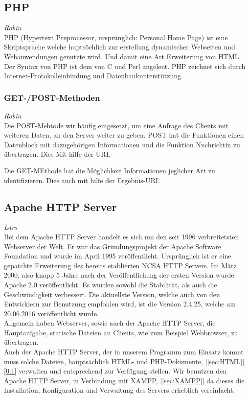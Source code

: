 \documentclass[12pt,a4paper,bibliography=totocnumbered,listof=totocnumbered]{scrartcl}
\begin{document}
\pagebreak
\subsection{PHP}
\label{sec:PHP}
\emph{Robin}\\
PHP (Hypertext Preprocessor, ursprünglich: Personal Home Page) ist eine Skriptsprache welche huptsöchlich zur erstellung dynamischer Webseiten und Webanwendungen genutzte wird. Und damit eine Art Erweiterung von HTML. Der Syntax von PHP ist dem von C und Perl angelent. PHP zeichnet sich durch Internet-Protokolleinbindung und Datenbankunterstützung.
 \cite{PHP}


\subsubsection{GET-/POST-Methoden}
\emph{Robin}\\
Die POST-Mehtode wir häufig eingesetzt, um eine Anfrage des Clients mit weiteren Daten, an den Server weiter zu geben. POST hat die Funktionen einen Datenblock mit dazugehörigen Informationen und die Funktion Nnchrichtin zu übertragen. Dies Mit hilfe der URI.

Die GET-MEthode hat die Möglichkeit Informationen jeglicher Art zu identifizieren. Dies auch mit hilfe der Ergebnis-URI.
\cite{GETPOST}

\subsection{Apache HTTP Server}
\label{sec:Apache}
\emph{Lars}\\
Bei dem Apache HTTP Server handelt es sich um den seit 1996 verbreitetsten Webserver der Welt. Er war das Gründungsprojekt der Apache Software Foundation und wurde im April 1995 veröffentlicht. Ursprünglich ist er eine gepatchte Erweiterung des bereits etablierten NCSA HTTP Servers. Im März 2000, also knapp 5 Jahre nach der Veröffentlichung der ersten Version wurde Apache 2.0 veröffentlicht. Es wurden sowohl die Stabilität, als auch die Geschwindigkeit verbessert. Die aktuellste Version, welche auch von den Entwicklern zur Benutzung empfohlen wird, ist die Version 2.4.25, welche am 20.06.2016 veröffentlicht wurde.\cite{wiki/Apache_HTTP_Server}\cite{apache.org}\\
Allgemein haben Webserver, sowie auch der Apache HTTP Server, die Hauptaufgabe, statische Dateien an Clients, wie zum Beispiel Webbrowser, zu übertragen. \cite{Webserver}\\
Auch der Apache HTTP Server, der in unserem Programm zum Einsatz kommt muss solche Dateien, hauptsächlich HTML- und PHP-Dokumente, [\ref{sec:HTML}][\ref{sec:PHP}] verwalten und entsprechend zur Verfügung stellen. Wir benutzen den Apache HTTP Server, in Verbindung mit XAMPP, [\ref{sec:XAMPP}] da dieses die Installation, Konfiguration und Verwaltung des Servers erheblich vereinfacht.
\end{document}
